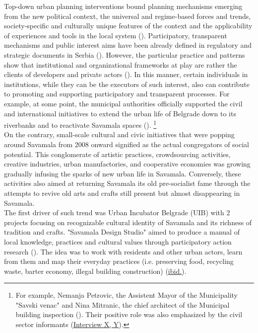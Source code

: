 \documentclass[11pt]{report}
\begin{document}
Top-down urban planning interventions bound planning mechanisms emerging from the new political context, the universal and regime-based forces and trends, society-specific and culturally unique features of the context and the applicability of experiences and tools in the local system (\citealt{nedovic-budic_adjustment_2001}).
Participatory, transparent mechanisms and public interest aims have been already defined in regulatory and strategic documents in Serbia (\citealt{vujosevic_conundrum_2012}).
However, the particular practice and patterns show that institutional and organizational frameworks at play are rather the clients of developers and private actors (\citealt{mrdjenovic_tatjana_urban_2015}).
In this manner, certain individuals in institutions, while they can be the executors of such interest, also can contribute to promoting and supporting participatory and transparent processes.
For example, at some point, the municipal authorities officially supported the civil and international initiatives to extend the urban life of Belgrade down to its riverbanks and to reactivate Savamala spaces (\citealt{doytchinov_urban_2015}).
\footnote{For example, Nemanja Petrovic, the Assistent Mayor of the Municipality "Savski venac" and Nina Mitranic, the chief architect of the Municipal building inspection (\citealt{doytchinov_urban_2015}). Their positive role was also emphasized by the civil sector informants (\href{InterviewX}{Interview X, Y}).}
\\

On the contrary, small-scale cultural and civic initiatives that were popping around Savamala from 2008 onward signified as the actual congregators of social potential.
This conglomerate of artistic practices, crowdsourcing activities, creative industries, urban manufactories, and cooperative economies was growing gradually infusing the sparks of new urban life in Savamala.
Conversely, these activities also aimed at returning Savamala its old pre-socialist fame through the attempts to revive old arts and crafts still present but almost disappearing in Savamala.
\\

The first driver of such trend was Urban Incubator Belgrade (UIB) with 2 projects focusing on recognizable cultural identity of Savamala and its richness of tradition and crafts.
"Savamala Design Studio" aimed to produce a manual of local knowledge, practices and cultural values through participatory action research (\href{Cvetinovic}{\cite{cvetinovic_engine_2013}}).
The idea was to work with residents and other urban actors, learn from them and map their everyday practices (i.e. preserving food, recycling waste, barter economy, illegal building construction) (\href{Cvetinovic}{ibid.}).
\\
\end{document}
